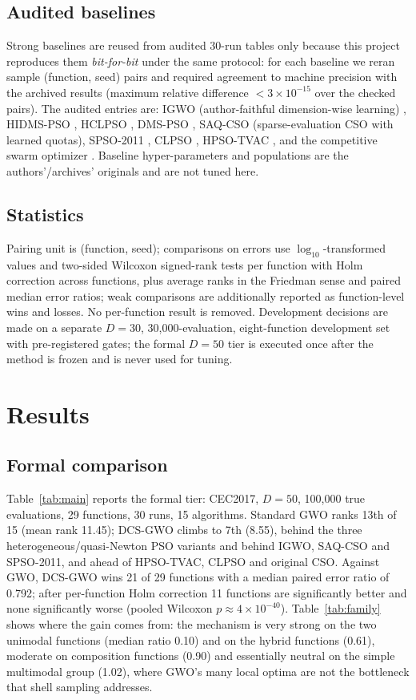 \documentclass[journal]{IEEEtran}
\newcommand{\method}{DCS-GWO}
\begin{document}
\subsection{Audited baselines}
\label{sec:baselines}
Strong baselines are reused from audited 30-run tables only because this
project reproduces them \emph{bit-for-bit} under the same protocol: for each
baseline we reran sample (function, seed) pairs and required agreement to
machine precision with the archived results (maximum relative difference
$<3\times10^{-15}$ over the checked pairs). The audited entries are:
IGWO (author-faithful dimension-wise learning) \cite{nadimi2021igwo},
HIDMS-PSO \cite{varna2020hidms}, HCLPSO \cite{lynn2015hclpso}, DMS-PSO
\cite{liang2005dms}, SAQ-CSO (sparse-evaluation CSO with learned quotas),
SPSO-2011 \cite{clerc2012spso}, CLPSO \cite{liang2006clpso}, HPSO-TVAC
\cite{ratnaweera2004hpso}, and the competitive swarm optimizer
\cite{cheng2015cso}. Baseline hyper-parameters and populations are the
authors'/archives' originals and are not tuned here.

\subsection{Statistics}
Pairing unit is (function, seed); comparisons on errors use
$\log_{10}$-transformed values and two-sided Wilcoxon signed-rank tests
\cite{wilcoxon1945} per function with Holm correction \cite{holm1979} across
functions, plus average ranks in the Friedman sense and paired median error
ratios; weak comparisons are additionally reported as function-level wins and
losses. No per-function result is removed. Development decisions are made on
a separate $D=30$, 30{,}000-evaluation, eight-function development set with
pre-registered gates; the formal $D=50$ tier is executed once after the
method is frozen and is never used for tuning.

\section{Results}
\subsection{Formal comparison}
Table~\ref{tab:main} reports the formal tier: CEC2017, $D=50$, 100{,}000
true evaluations, 29 functions, 30 runs, 15 algorithms. Standard GWO ranks
13th of 15 (mean rank 11.45); \method{} climbs to 7th (8.55), behind the
three heterogeneous/quasi-Newton PSO variants and behind IGWO,
SAQ-CSO and SPSO-2011, and ahead of HPSO-TVAC, CLPSO and original CSO.
Against GWO, \method{} wins 21 of 29 functions with a median paired error
ratio of 0.792; after per-function Holm correction 11 functions are
significantly better and none significantly worse (pooled Wilcoxon
$p\approx 4\times10^{-40}$). Table~\ref{tab:family} shows where the gain
comes from: the mechanism is very strong on the two unimodal functions
(median ratio 0.10) and on the hybrid functions (0.61), moderate on
composition functions (0.90) and essentially neutral on the simple
multimodal group (1.02), where GWO's many local optima are not the
bottleneck that shell sampling addresses.
\end{document}

